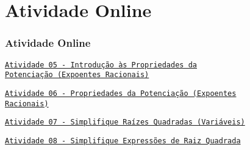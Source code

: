 

\section{Atividade Online}
\begin{frame}
\frametitle{Atividade Online} 

\href{https://pt.khanacademy.org/math/algebra/rational-exponents-and-radicals/rational-exponents-and-the-properties-of-exponents/e/exponents_4}{{\tt Atividade 05 - Introdução às Propriedades da \\Potenciação  (Expoentes Racionais)}}

\href{https://pt.khanacademy.org/math/algebra2/x2ec2f6f830c9fb89:exp/x2ec2f6f830c9fb89:exp-properties/e/rational-exp-prop-challenge}{{\tt Atividade 06 - Propriedades da Potenciação (Expoentes \\ Racionais)}}


\href{https://pt.khanacademy.org/math/algebra/rational-exponents-and-radicals/alg1-simplify-square-roots/e/multiplying_radicals}
{{\tt Atividade 07 - Simplifique Raízes Quadradas (Variáveis)}}

\href{https://pt.khanacademy.org/math/algebra/rational-exponents-and-radicals/alg1-simplify-square-roots/e/adding_and_subtracting_radicals}
{{\tt Atividade 08 - Simplifique Expressões de Raiz Quadrada}}


\end{frame}

